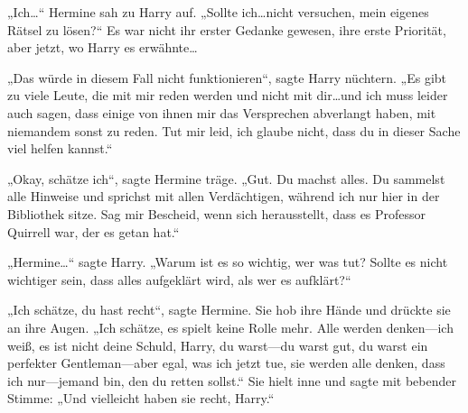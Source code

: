 „Ich…“ Hermine sah zu Harry auf. „Sollte ich…nicht versuchen, mein eigenes Rätsel zu lösen?“ Es war nicht ihr erster Gedanke gewesen, ihre erste Priorität, aber jetzt, wo Harry es erwähnte…

„Das würde in diesem Fall nicht funktionieren“, sagte Harry nüchtern. „Es gibt zu viele Leute, die mit mir reden werden und nicht mit dir…und ich muss leider auch sagen, dass einige von ihnen mir das Versprechen abverlangt haben, mit niemandem sonst zu reden. Tut mir leid, ich glaube nicht, dass du in dieser Sache viel helfen kannst.“

„Okay, schätze ich“, sagte Hermine träge. „Gut. Du machst alles. Du sammelst alle Hinweise und sprichst mit allen Verdächtigen, während ich nur hier in der Bibliothek sitze. Sag mir Bescheid, wenn sich herausstellt, dass es Professor Quirrell war, der es getan hat.“

„Hermine…“ sagte Harry. „Warum ist es so wichtig, wer was tut? Sollte es nicht wichtiger sein, dass alles aufgeklärt wird, als wer es aufklärt?“

„Ich schätze, du hast recht“, sagte Hermine. Sie hob ihre Hände und drückte sie an ihre Augen. „Ich schätze, es spielt keine Rolle mehr. Alle werden denken—ich weiß, es ist nicht deine Schuld, Harry, du warst—du warst gut, du warst ein perfekter Gentleman—aber egal, was ich jetzt tue, sie werden alle denken, dass ich nur—jemand bin, den du retten sollst.“
Sie hielt inne und sagte mit bebender Stimme: „Und vielleicht haben sie recht, Harry.“

